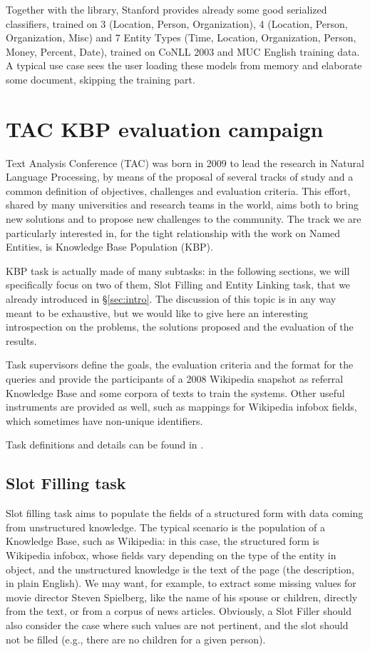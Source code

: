 \documentclass[a4paper,11pt]{report}
\begin{document}
Together with the library, Stanford provides already some good serialized classifiers, trained on 3 (Location, Person, Organization), 4 (Location, Person, Organization, Misc) and 7 Entity Types (Time, Location, Organization, Person, Money, Percent, Date), trained on CoNLL 2003 and MUC English training data. A typical use case sees the user loading these models from memory and elaborate some document, skipping the training part.

\chapter{TAC KBP evaluation campaign}
Text Analysis Conference (TAC) was born in 2009 to lead the research in Natural Language Processing, by means of the proposal of several tracks of study and a common definition of objectives, challenges and evaluation criteria. This effort, shared by many universities and research teams in the world, aims both to bring new solutions and to propose new challenges to the community. The track we are particularly interested in, for the tight relationship with the work on Named Entities, is Knowledge Base Population (KBP).

KBP task is actually made of many subtasks: in the following sections, we will specifically focus on two of them, Slot Filling and Entity Linking task, that we already introduced in \S \ref{sec:intro}. The discussion of this topic is in any way meant to be exhaustive, but we would like to give here an interesting introspection on the problems, the solutions proposed and the evaluation of the results.

Task supervisors define the goals, the evaluation criteria and the format for the queries and provide the participants of a 2008 Wikipedia snapshot as referral Knowledge Base and some corpora of texts to train the systems. Other useful instruments are provided as well, such as mappings for Wikipedia infobox fields, which sometimes have non-unique identifiers.

Task definitions and details can be found in \cite{tac2009, tac2010, tac2011, tac2012}.


\section{Slot Filling task}
Slot filling task aims to populate the fields of a structured form with data coming from unstructured knowledge. The typical scenario is the population of a Knowledge Base, such as Wikipedia: in this case, the structured form is Wikipedia infobox, whose fields vary depending on the type of the entity in object, and the unstructured knowledge is the text of the page (the description, in plain English).
We may want, for example, to extract some missing values for movie director Steven Spielberg, like the name of his spouse or children, directly from the text, or from a corpus of news articles. Obviously, a Slot Filler should also consider the case where such values are not pertinent, and the slot should not be filled (e.g., there are no children for a given person).
\end{document}
